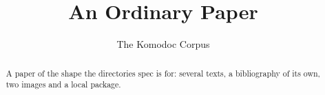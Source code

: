 \documentclass[11pt]{article}
\title{An Ordinary Paper}
\author{The Komodoc Corpus}
\date{}
\begin{document}
\maketitle

\begin{abstract}
  A paper of the shape the directories spec is for: several texts, a
  bibliography of its own, two images and a local package.
\end{abstract}






\end{document}
